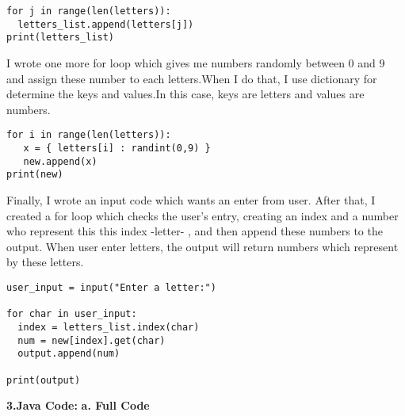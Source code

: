 \documentclass{report}
\begin{document}
\begin{lstlisting}
for j in range(len(letters)):
  letters_list.append(letters[j])
print(letters_list)
\end{lstlisting}



\begin{flushleft}
I wrote one more for loop which gives me numbers randomly between 0 and 9 and assign these number to each letters.When I do that, I use dictionary for determine the keys and values.In this case, keys are letters and values are numbers.
\end{flushleft}

\begin{lstlisting}
for i in range(len(letters)):
   x = { letters[i] : randint(0,9) }
   new.append(x)
print(new)
\end{lstlisting}


\begin{flushleft}
Finally, I wrote an input code which wants an enter from user. After that, I created a for loop which checks the user's entry, creating an index and a number who represent this this index -letter- , and then append these numbers to the output. When user enter letters, the output will return numbers which represent by these letters.
\end{flushleft}

\begin{lstlisting}
user_input = input("Enter a letter:")

for char in user_input:
  index = letters_list.index(char)
  num = new[index].get(char)
  output.append(num)

print(output)
\end{lstlisting}


\newpage

{\Large \textbf{3.Java Code:}}
\newline
\newline
\newline
{\large \textbf{a. Full Code}}
\end{document}
